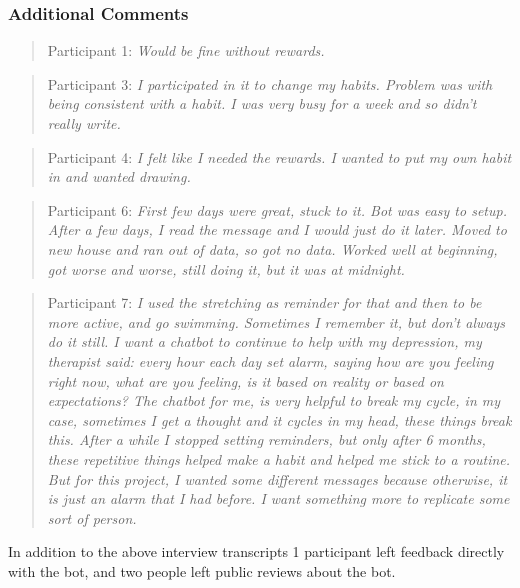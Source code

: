 \subsubsection*{Additional Comments}
\begin{quote}
Participant 1: \textit{Would be fine without rewards.}
\end{quote}
\begin{quote}
Participant 3: \textit{I participated in it to change my habits. Problem was with being consistent with a habit. I was very busy for a week and so didn't really write.}
\end{quote}
\begin{quote}
Participant 4: \textit{I felt like I needed the rewards. I wanted to put my own habit in and wanted drawing.}
\end{quote}
\begin{quote}
Participant 6: \textit{First few days were great, stuck to it. Bot was easy to setup. After a few days, I read the message and I would just do it later. Moved to new house and ran out of data, so got no data. Worked well at beginning, got worse and worse, still doing it, but it was at midnight.}
\end{quote}
\begin{quote}
Participant 7: \textit{I used the stretching as reminder for that and then to be more active, and go swimming. Sometimes I remember it, but don't always do it still. I want a chatbot to continue to help with my depression, my therapist said: every hour each day set alarm, saying how are you feeling right now, what are you feeling, is it based on reality or based on expectations? The chatbot for me, is very helpful to break my cycle, in my case, sometimes I get a thought and it cycles in my head, these things break this. After a while I stopped setting reminders, but only after 6 months, these repetitive things helped make a habit and helped me stick to a routine. But for this project, I wanted some different messages because otherwise, it is just an alarm that I had before. I want something more to replicate some sort of person.}
\end{quote}

In addition to the above interview transcripts 1 participant left feedback directly with the bot, and two people left public reviews about the bot.

